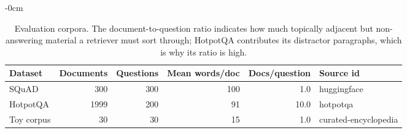 \begin{table}[t]
\begin{adjustwidth}{-\extralength}{0cm}
\footnotesize
\setlength{\tabcolsep}{3pt}
\caption{Evaluation corpora. The document-to-question ratio indicates how much topically adjacent but non-answering material a retriever must sort through; HotpotQA contributes its distractor paragraphs, which is why its ratio is high.\label{tab:datasets}}
\begin{tabular}{lrrrrl}
\toprule
\textbf{Dataset} & \textbf{Documents} & \textbf{Questions} & \textbf{Mean words/doc} & \textbf{Docs/question} & \textbf{Source id}\\
\midrule
SQuAD & 300 & 300 & 100 & 1.0 & huggingface\\
HotpotQA & 1999 & 200 & 91 & 10.0 & hotpotqa\\
Toy corpus & 30 & 30 & 15 & 1.0 & curated-encyclopedia\\
\bottomrule
\end{tabular}
\end{adjustwidth}
\end{table}
